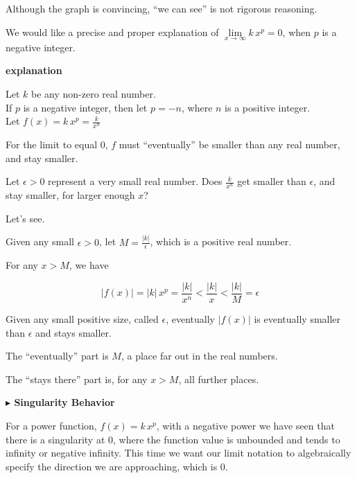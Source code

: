\documentclass{ximera}
\begin{document}
\begin{notation}


Although the graph is convincing, ``we can see'' is not rigorous reasoning. 


We would like a precise and proper explanation of $\lim\limits_{x \to \infty} k \, x^p = 0$, when $p$ is a negative integer. 


\textbf{\textcolor{red!75!green}{explanation}} 


Let $k$ be any non-zero real number. \\
If $p$ is a negative integer, then let $p = -n$, where $n$ is a positive integer. \\
Let $f(x) = k \, x^p = \frac{k}{x^n}$ 



For the limit to equal $0$, $f$ must ``eventually'' be smaller than any real number, and stay smaller. 


Let $\epsilon > 0$ represent a very small real number.  Does $\frac{k}{x^n}$ get smaller than $\epsilon$, and stay smaller, for larger enough $x$? 

Let's see. 



Given any small $\epsilon > 0$, let $M = \frac{| k |}{\epsilon}$, which is a positive real number.


For any $x > M$, we have 

\[
| f(x) | = | k | \, x^p  = \frac{| k |}{x^n} < \frac{| k |}{x} < \frac{| k |}{M}  = \epsilon
\] 


Given any small positive size, called $\epsilon$, eventually $| f(x) |$ is eventually smaller than $\epsilon$ and stays smaller. 



The ``eventually'' part is $M$, a place far out in the real numbers. 

The ``stays there'' part is, for any $x > M$, all further places.


\end{notation}
















\textbf{\textcolor{blue!55!black}{$\blacktriangleright$  \textbf{Singularity Behavior}}} 



For a power function, $f(x) = k \, x^p$, with a negative power we have seen that there is a singularity at $0$, where the function value is unbounded and tends to infinity or negative infinity.  This time we want our limit notation to algebraically specify the direction we are approaching, which is $0$.  
\end{document}
